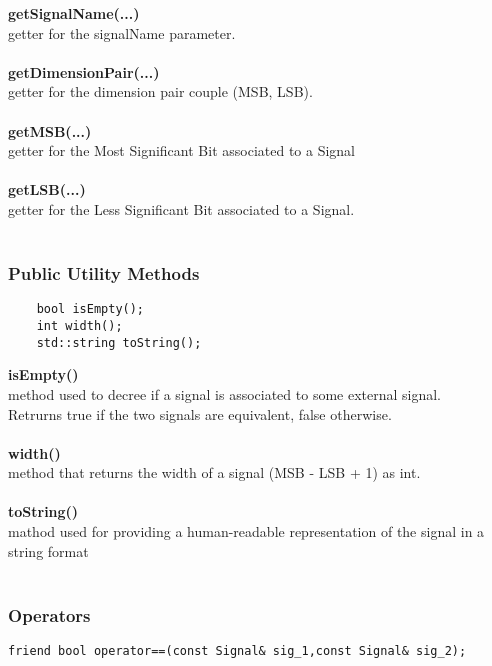 \documentclass{article}
\begin{document}
\textbf{getSignalName(...)}\\
getter for the signalName parameter.\\\\
\textbf{getDimensionPair(...)}\\
getter for the dimension pair couple (MSB, LSB).\\\\
\textbf{getMSB(...)}\\
getter for the Most Significant Bit associated to a Signal\\\\
\textbf{getLSB(...)}\\
getter for the Less Significant Bit associated to a Signal.\\\\
	
\subsubsection{Public Utility Methods}

\begin{mdframed}[hidealllines=true, backgroundcolor=magenta!10]
	\begin{lstlisting}
	bool isEmpty();
	int width();
	std::string toString();
	\end{lstlisting}
\end{mdframed}

\textbf{isEmpty()}\\
method used to decree if a signal is associated to some external signal.\\
Retrurns true if the two signals are equivalent, false otherwise.\\\\
\textbf{width()}\\
method that returns the width of a signal (MSB - LSB + 1) as int.\\\\
\textbf{toString()}\\
mathod used for providing a human-readable representation of the signal in a string format\\\\

\subsubsection{Operators}

\begin{mdframed}[hidealllines=true, backgroundcolor=magenta!10]
	\begin{lstlisting}[basicstyle=\tiny]
	friend bool operator==(const Signal& sig_1,const Signal& sig_2);
	\end{lstlisting}
\end{mdframed}
\end{document}
